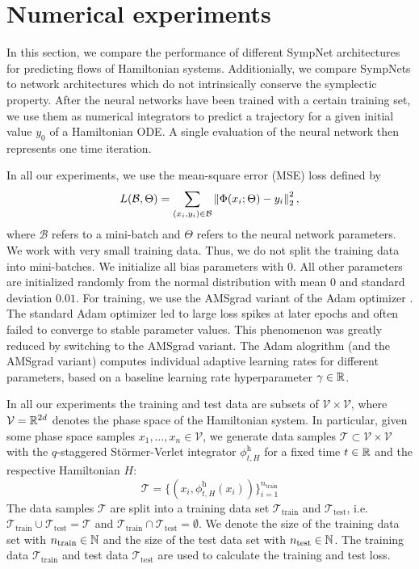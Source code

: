 \documentclass[twoside,a4paper]{article}
\begin{document}
\section{Numerical experiments}\label{sec_numerical_experiments}

In this section, we compare the performance of different SympNet architectures 
for predicting flows of Hamiltonian systems.
Additionially, we compare SympNets to network architectures which do not intrinsically
conserve the symplectic property.
After the neural networks have been trained with a certain training set,
we use them as numerical integrators
to predict a trajectory for a given initial value $y_0$ of a Hamiltonian ODE.
A single evaluation of the neural network then represents one time iteration.

In all our experiments, we use the mean-square error (MSE) loss defined by
\begin{equation*}
	L(\mathcal{B}, \Theta) = \sum_{(x_i, y_i) \in \mathcal{B}} \left\lVert{\Phi(x_i; \Theta) - y_i}\right\rVert^2_2
	,
\end{equation*}
where $\mathcal{B}$ refers to a mini-batch and $\Theta$ refers to the neural network parameters.
We work with very small training data. Thus, we do not split the training data into mini-batches.
We initialize all bias parameters with $0$. All other parameters are initialized randomly from
the normal distribution with mean $0$ and standard deviation $0.01$.
For training, we use the AMSgrad variant of the Adam optimizer \cite{amsgrad2018}.
The standard Adam optimizer led to large loss spikes at later epochs and often
failed to converge to stable parameter values. This phenomenon
was greatly reduced by switching to the AMSgrad variant. The Adam alogrithm (and the AMSgrad variant)
computes individual adaptive learning rates for different parameters, based on a baseline
learning rate hyperparameter $\gamma \in \mathbb{R}$.

In all our experiments the training and test data are subsets of $\mathcal{V} \times \mathcal{V}$,
where $\mathcal{V} = \mathbb{R}^{2d}$ denotes the phase space of the Hamiltonian system. In particular,
given some phase space samples $x_1, \dots, x_n \in \mathcal{V}$, we generate data samples 
$\mathcal{T} \subset \mathcal{V} \times \mathcal{V}$
with the $q$-staggered Störmer-Verlet integrator $\phi^{\text{h}}_{t,H}$
for a fixed time $t \in \mathbb{R}$ and the respective Hamiltonian $H$:
\begin{equation*}
	\mathcal{T} = \{ (x_i, \phi^{\text{h}}_{t,H}(x_i)) \}_{i=1}^{n_{\text{train}}}
\end{equation*}
The data samples $\mathcal{T}$ are split into a training data set $\mathcal{T}_{\text{train}}$
and $\mathcal{T}_{\text{test}}$, i.e. $\mathcal{T}_{\text{train}} \cup \mathcal{T}_{\text{test}} = \mathcal{T}$
and $\mathcal{T}_{\text{train}} \cap \mathcal{T}_{\text{test}} = \emptyset$. 
We denote the size of the training data set with $n_{\text{train}} \in \mathbb{N}$ and the size of
the test data set with $n_{\text{test}} \in \mathbb{N}$.
The training data
$\mathcal{T}_{\text{train}}$ and test data $\mathcal{T}_{\text{test}}$ are used to 
calculate the training and test loss.
\end{document}

